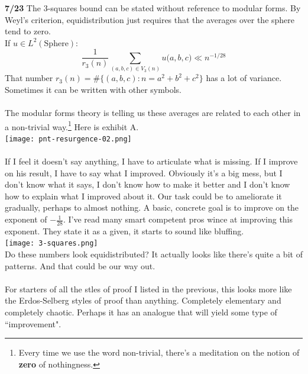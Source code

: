 \documentclass[12pt]{article}
\begin{document}
\newpage

\noindent \textbf{7/23} The 3-squares bound can be stated without reference to modular forms.  By Weyl's criterion, equidistribution just requires that the averages over the sphere tend to zero.  \\ If $u \in L^2 ( \text{Sphere})$:
$$  \frac{1}{r_3(n)} \sum_{(a,b,c) \in V_3(n)} u \big( a, b, c \big) \ll n^{-1/28} $$
That number $r_3(n) = \# \{ (a,b,c) : n = a^2 + b^2 + c^2 \}$ has a lot of variance. Sometimes it can be written with other symbols. \\ \\
The modular forms theory is telling us these averages are related to each other in a non-trivial way.\footnote{Every time we use the word non-trivial, there's a meditation on the notion of \textbf{zero} of nothingness.} Here is exhibit A. \\
\texttt{[image: pnt-resurgence-02.png]} \\ \\
If I feel it doesn't say anything, I have to articulate what is missing.  If I improve on his result, I have to say what I improved.  Obviously it's a big mess, but I don't know what it says, I don't know how to make it better and I don't know how to explain what I improved about it. Our task could be to ameliorate it gradually, perhaps to almost nothing.   A basic, concrete goal is to improve on the exponent of $- \frac{1}{28}$. I've read many smart competent pros wince at improving this exponent. They state it as a given, it starts to sound like bluffing.  \\
\texttt{[image: 3-squares.png]} \\
Do these numbers look equidistributed?  It actually looks like there's quite a bit of patterns.  And that could be our way out. \\ \\
For starters of all the stles of proof I listed in the previous, this looks more like the Erdos-Selberg styles of proof than anything.  Completely elementary and completely chaotic.  Perhaps it has an analogue that will yield some type of ``improvement".
\end{document}
